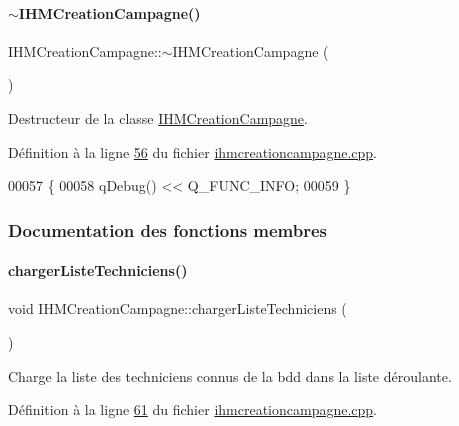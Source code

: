 \paragraph{\texorpdfstring{$\sim$\+I\+H\+M\+Creation\+Campagne()}{~IHMCreationCampagne()}}
{\footnotesize\ttfamily I\+H\+M\+Creation\+Campagne\+::$\sim$\+I\+H\+M\+Creation\+Campagne (\begin{DoxyParamCaption}{ }\end{DoxyParamCaption})}



Destructeur de la classe \hyperlink{class_i_h_m_creation_campagne}{I\+H\+M\+Creation\+Campagne}. 



Définition à la ligne \hyperlink{ihmcreationcampagne_8cpp_source_l00056}{56} du fichier \hyperlink{ihmcreationcampagne_8cpp_source}{ihmcreationcampagne.\+cpp}.


\begin{DoxyCode}
00057 \{
00058     qDebug() << Q\_FUNC\_INFO;
00059 \}
\end{DoxyCode}


\subsubsection{Documentation des fonctions membres}
\mbox{\label{class_i_h_m_creation_campagne_a0648a6013cec5557150d0addf30e2bbc}} 
\paragraph{\texorpdfstring{charger\+Liste\+Techniciens()}{chargerListeTechniciens()}}
{\footnotesize\ttfamily void I\+H\+M\+Creation\+Campagne\+::charger\+Liste\+Techniciens (\begin{DoxyParamCaption}{ }\end{DoxyParamCaption})\hspace{0.3cm}{\ttfamily [private]}}



Charge la liste des techniciens connus de la bdd dans la liste déroulante. 



Définition à la ligne \hyperlink{ihmcreationcampagne_8cpp_source_l00061}{61} du fichier \hyperlink{ihmcreationcampagne_8cpp_source}{ihmcreationcampagne.\+cpp}.



